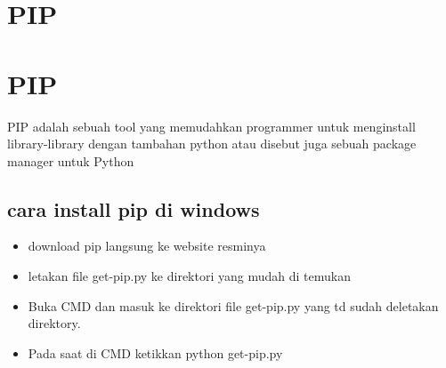 
\section{PIP}

    \section{PIP}
	PIP adalah sebuah tool yang memudahkan programmer untuk menginstall library-library  dengan tambahan python atau disebut juga sebuah package manager untuk Python

	\subsection{cara install pip di windows}
		\begin{itemize}
			\item download pip langsung ke website resminya 
			\item  letakan file get-pip.py ke direktori yang mudah di temukan
			\item  Buka CMD  dan masuk ke direktori file get-pip.py yang td sudah deletakan direktory.
			\item Pada saat di  CMD ketikkan python get-pip.py
		\end{itemize}